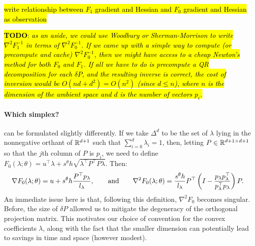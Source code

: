 \documentclass[eikonal.tex]{subfiles}
\begin{document}
\begin{corollary}
  \hl{write relationship between $F_1$ gradient and Hessian and $F_0$
    gradient and Hessian as observation}
\end{corollary}

\noindent \hl{\textbf{TODO}: \emph{as an aside, we could use Woodbury
    or Sherman-Morrison to write $\nabla^2 F_1^{-1}$ in terms of
    $\nabla^2 F_0^{-1}$. If we came up with a simple way to compute
    (or precompute and cache) $\nabla^2 F_0^{-1}$, then we might have
    access to a cheap Newton's method for both $F_0$ and $F_1$. If all
    we have to do is precompute a QR decomposition for each
    $\delta P$, and the resulting inverse is correct, the cost of
    inversion would be $O(nd + d^2) = O(n^2)$ (since $d \leq n$),
    where $n$ is the dimension of the ambient space and $d$ is the
    number of vectors $p_i$.}}

\paragraph{Which simplex?}
 can be formulated
slightly differently. If we take $\Delta^d$ to be the set of $\lambda$
lying in the nonnegative orthant of $\mathbb{R}^{d+1}$ such that
$\sum_{i=0}^d \lambda_i = 1$, then, letting
$P \in \mathbb{R}^{d + 1 \times d + 1}$ so that the $j$th column of $P$ is
$p_i$, we need to define
$F_0(\lambda; \theta) = u^\top \lambda + s^{\theta} h \sqrt{\lambda^\top
  P^\top P \lambda}$. Then:
\begin{equation*}
  \nabla F_0(\lambda; \theta) = u + s^{\theta} h \frac{P^\top p_\lambda}{l_\lambda}, \qquad \text{and} \qquad \nabla^2 F_0(\lambda; \theta) = \frac{s^{\theta} h}{l_\lambda} P^\top \left(I - \frac{p_\lambda p_\lambda^\top}{p_\lambda^\top p_\lambda}\right) P.
\end{equation*}
An immediate issue here is that, following this definition,
$\nabla^2 F_0$ becomes singular. Before, the size of $\delta P$
allowed us to mitigate the degeneracy of the orthogonal projection
matrix. This motivates our choice of convention for the convex
coefficients $\lambda$, along with the fact that the smaller dimension
can potentially lead to savings in time and space (however modest).
\end{document}
